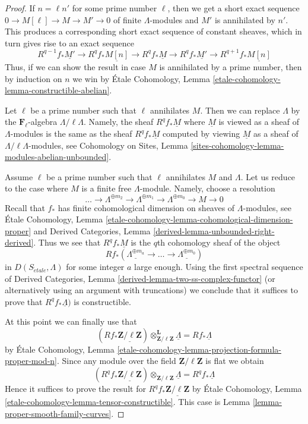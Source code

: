 \documentclass{stacks-project}
\theoremstyle{plain}
\theoremstyle{definition}
\theoremstyle{remark}
\numberwithin{equation}{subsection}
\def\etale{{\acute{e}tale}}
\begin{document}
\begin{proof}
If $n = \ell n'$ for some prime number $\ell$, then
we get a short exact sequence $0 \to M[\ell] \to M \to M' \to 0$
of finite $\Lambda$-modules and $M'$ is annihilated by $n'$.
This produces a corresponding short exact sequence of constant
sheaves, which in turn gives rise to an exact sequence
$$
R^{q - 1}f_*\underline{M'} \to
R^qf_*\underline{M[n]} \to
R^qf_*\underline{M} \to
R^qf_*\underline{M'} \to
R^{q + 1}f_*\underline{M[n]}
$$
Thus, if we can show the result in case $M$ is annihilated by
a prime number, then by induction on $n$ we win by
\'Etale Cohomology, Lemma \ref{etale-cohomology-lemma-constructible-abelian}.

\medskip\noindent
Let $\ell$ be a prime number such that $\ell$ annihilates $M$.
Then we can replace $\Lambda$ by the $\mathbf{F}_\ell$-algebra
$\Lambda/\ell \Lambda$. Namely, the sheaf $R^qf_*\underline{M}$
where $\underline{M}$ is viewed as a sheaf of $\Lambda$-modules
is the same as the sheaf $R^qf_*\underline{M}$ computed by
viewing $\underline{M}$ as a sheaf of $\Lambda/\ell \Lambda$-modules, see
Cohomology on Sites, Lemma
\ref{sites-cohomology-lemma-modules-abelian-unbounded}.

\medskip\noindent
Assume $\ell$ be a prime number such that $\ell$ annihilates $M$ and $\Lambda$.
Let us reduce to the case where $M$ is a finite free $\Lambda$-module.
Namely, choose a resolution
$$
\ldots \to
\Lambda^{\oplus m_2} \to
\Lambda^{\oplus m_1} \to
\Lambda^{\oplus m_0} \to
M \to 0
$$
Recall that $f_*$ has finite cohomological dimension on sheaves of
$\Lambda$-modules, see
\'Etale Cohomology, Lemma
\ref{etale-cohomology-lemma-cohomological-dimension-proper}
and
Derived Categories, Lemma \ref{derived-lemma-unbounded-right-derived}.
Thus we see that $R^qf_*\underline{M}$ is the $q$th cohomology
sheaf of the object
$$
Rf_*(\underline{\Lambda^{\oplus m_a}} \to \ldots \to
\underline{\Lambda^{\oplus m_0}})
$$
in $D(S_\etale, \Lambda)$ for some integer $a$ large enough.
Using the first spectral sequence of
Derived Categories, Lemma \ref{derived-lemma-two-ss-complex-functor}
(or alternatively using an argument with truncations)
we conclude that it suffices to prove that $R^qf_*\underline{\Lambda})$
is constructible.

\medskip\noindent
At this point we can finally use that
$$
(Rf_*\underline{\mathbf{Z}/\ell\mathbf{Z}})
\otimes_{\mathbf{Z}/\ell\mathbf{Z}}^\mathbf{L} \underline{\Lambda} =
Rf_*\underline{\Lambda}
$$
by \'Etale Cohomology, Lemma
\ref{etale-cohomology-lemma-projection-formula-proper-mod-n}.
Since any module over the field $\mathbf{Z}/\ell\mathbf{Z}$
is flat we obtain
$$
(R^qf_*\underline{\mathbf{Z}/\ell\mathbf{Z}})
\otimes_{\mathbf{Z}/\ell\mathbf{Z}} \underline{\Lambda} =
R^qf_*\underline{\Lambda}
$$
Hence it suffices to prove the result for
$R^qf_*\underline{\mathbf{Z}/\ell\mathbf{Z}}$
by \'Etale Cohomology, Lemma \ref{etale-cohomology-lemma-tensor-constructible}.
This case is Lemma \ref{lemma-proper-smooth-family-curves}.
\end{proof}
\end{document}
